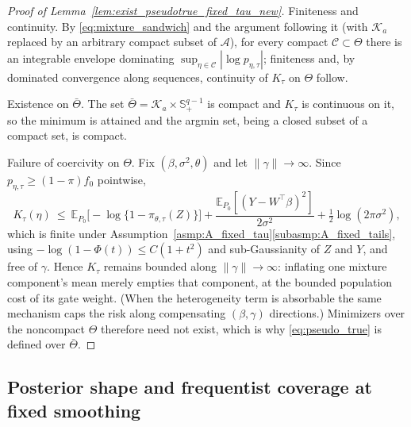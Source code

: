 \documentclass[11pt]{article}
\theoremstyle{definition}
\theoremstyle{plain}
\newcommand{\E}{\mathbb{E}}
\begin{document}
\begin{proof}[Proof of Lemma~\ref{lem:exist_pseudotrue_fixed_tau_new}]\label{proof:lem:exist_pseudotrue_fixed_tau_new}
Finiteness and continuity. By \eqref{eq:mixture_sandwich} and the argument following it (with $\mathcal K_a$ replaced by an arbitrary compact subset of $\mathcal A$), for every compact $\mathcal C\subset\Theta$ there is an integrable envelope dominating $\sup_{\eta\in\mathcal C}|\log p_{\eta,\tau}|$; finiteness and, by dominated convergence along sequences, continuity of $K_\tau$ on $\Theta$ follow.

Existence on $\bar\Theta$. The set $\bar\Theta=\mathcal K_a\times\mathbb S^{q-1}_+$ is compact and $K_\tau$ is continuous on it, so the minimum is attained and the argmin set, being a closed subset of a compact set, is compact.

Failure of coercivity on $\Theta$. Fix $(\beta,\sigma^2,\theta)$ and let $\|\gamma\|\to\infty$. Since $p_{\eta,\tau}\ge(1-\pi)f_0$ pointwise,
\[
K_\tau(\eta)\ \le\ \E_{P_0}\big[-\log\{1-\pi_{\theta,\tau}(Z)\}\big]
+\frac{\E_{P_0}[(Y-W^\top\beta)^2]}{2\sigma^2}+\tfrac12\log(2\pi\sigma^2),
\]
which is finite under Assumption~\ref{asmp:A_fixed_tau}\ref{subasmp:A_fixed_tails}, using $-\log(1-\Phi(t))\le C(1+t^2)$ and sub-Gaussianity of $Z$ and $Y$, and free of $\gamma$. Hence $K_\tau$ remains bounded along $\|\gamma\|\to\infty$: inflating one mixture component's mean merely empties that component, at the bounded population cost of its gate weight. (When the heterogeneity term is absorbable the same mechanism caps the risk along compensating $(\beta,\gamma)$ directions.) Minimizers over the noncompact $\Theta$ therefore need not exist, which is why \eqref{eq:pseudo_true} is defined over $\bar\Theta$.
\end{proof}

\subsection{Posterior shape and frequentist coverage at fixed smoothing}
\end{document}
